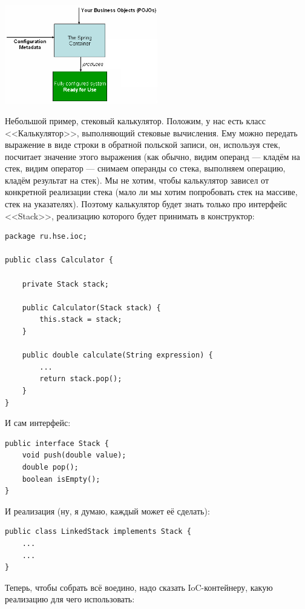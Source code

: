 \documentclass[a5paper]{article}
\begin{document}
\begin{center}
    \includegraphics[width=0.5\textwidth]{springIoC.png}
\end{center}

Небольшой пример, стековый калькулятор. Положим, у нас есть класс <<Калькулятор>>, выполняющий стековые вычисления. Ему можно передать выражение в виде строки в обратной польской записи, он, используя стек, посчитает значение этого выражения (как обычно, видим операнд --- кладём на стек, видим оператор --- снимаем операнды со стека, выполняем операцию, кладём результат на стек). Мы не хотим, чтобы калькулятор зависел от конкретной реализации стека (мало ли мы хотим попробовать стек на массиве, стек на указателях). Поэтому калькулятор будет знать только про интерфейс <<Stack>>, реализацию которого будет принимать в конструктор:

\begin{verbatim}
package ru.hse.ioc;

public class Calculator {

    private Stack stack;

    public Calculator(Stack stack) {
        this.stack = stack;
    }

    public double calculate(String expression) {
        ...
        return stack.pop();
    }
}
\end{verbatim}

И сам интерфейс:

\begin{verbatim}
public interface Stack {
    void push(double value);
    double pop();
    boolean isEmpty();
}
\end{verbatim}

И реализация (ну, я думаю, каждый может её сделать):

\begin{verbatim}
public class LinkedStack implements Stack {
    ...
    ...
}
\end{verbatim}

Теперь, чтобы собрать всё воедино, надо сказать IoC-контейнеру, какую реализацию для чего использовать:
\end{document}
